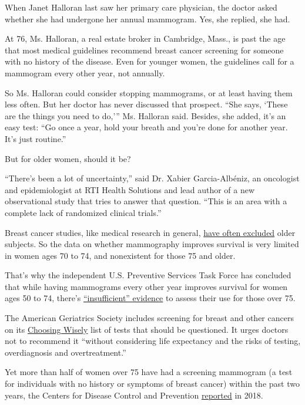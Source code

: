 When Janet Halloran last saw her primary care physician, the doctor
asked whether she had undergone her annual mammogram. Yes, she replied,
she had.

At 76, Ms. Halloran, a real estate broker in Cambridge, Mass., is past
the age that most medical guidelines recommend breast cancer screening
for someone with no history of the disease. Even for younger women, the
guidelines call for a mammogram every other year, not annually.

So Ms. Halloran could consider stopping mammograms, or at least having
them less often. But her doctor has never discussed that prospect. ``She
says, `These are the things you need to do,''' Ms. Halloran said.
Besides, she added, it's an easy test: ``Go once a year, hold your
breath and you're done for another year. It's just routine.''

But for older women, should it be?

``There's been a lot of uncertainty,'' said Dr. Xabier Garcia-Albéniz,
an oncologist and epidemiologist at RTI Health Solutions and lead author
of a new observational study that tries to answer that question. ``This
is an area with a complete lack of randomized clinical trials.''

Breast cancer studies, like medical research in general,
\href{https://www.nytimes3xbfgragh.onion/2018/04/13/health/elderly-clinical-trials.html}{have
often excluded} older subjects. So the data on whether mammography
improves survival is very limited in women ages 70 to 74, and
nonexistent for those 75 and older.

That's why the independent U.S. Preventive Services Task Force has
concluded that while having mammograms every other year improves
survival for women ages 50 to 74, there's
\href{https://www.uspreventiveservicestaskforce.org/Page/Document/RecommendationStatementFinal/breast-cancer-screening}{``insufficient''
evidence} to assess their use for those over 75.

The American Geriatrics Society includes screening for breast and other
cancers on its
\href{https://www.choosingwisely.org/societies/american-geriatrics-society/}{Choosing
Wisely} list of tests that should be questioned. It urges doctors not to
recommend it ``without considering life expectancy and the risks of
testing, overdiagnosis and overtreatment.''

Yet more than half of women over 75 have had a screening mammogram (a
test for individuals with no history or symptoms of breast cancer)
within the past two years, the Centers for Disease Control and
Prevention
\href{https://www.cdc.gov/nchs/data/hus/2018/033.pdf}{reported} in 2018.


